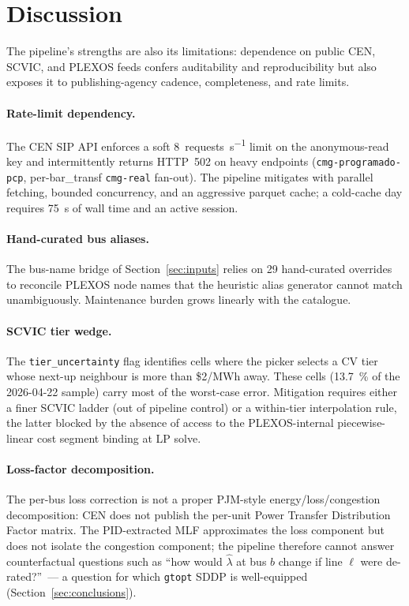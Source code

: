 \section{Discussion}
\label{sec:discussion}

The pipeline's strengths are also its limitations: dependence on
public CEN, SCVIC, and PLEXOS feeds confers auditability and
reproducibility but also exposes it to publishing-agency cadence,
completeness, and rate limits.

\paragraph{Rate-limit dependency.}
The CEN SIP API enforces a soft \SI{8}{requests\per\second} limit on
the anonymous-read key and intermittently returns HTTP~502 on heavy
endpoints (\texttt{cmg-programado-pcp}, per-bar\_transf
\texttt{cmg-real} fan-out).  The pipeline mitigates with parallel
fetching, bounded concurrency, and an aggressive parquet cache; a
cold-cache day requires \SI{75}{\second} of wall time and an active
session.

\paragraph{Hand-curated bus aliases.}
The bus-name bridge of Section~\ref{sec:inputs} relies on \num{29}
hand-curated overrides to reconcile PLEXOS node names that the
heuristic alias generator cannot match unambiguously.  Maintenance
burden grows linearly with the catalogue.

\paragraph{SCVIC tier wedge.}
The \texttt{tier\_uncertainty} flag identifies cells where the picker
selects a CV tier whose next-up neighbour is more than \$2/MWh away.
These cells (\SI{13.7}{\percent} of the 2026-04-22 sample) carry
most of the worst-case error.  Mitigation requires either a finer
SCVIC ladder (out of pipeline control) or a within-tier interpolation
rule, the latter blocked by the absence of access to the
PLEXOS-internal piecewise-linear cost segment binding at LP solve.

\paragraph{Loss-factor decomposition.}
The per-bus loss correction is not a proper PJM-style
energy/loss/congestion decomposition: CEN does not publish the
per-unit Power Transfer Distribution Factor matrix.  The PID-extracted
MLF approximates the loss component but does not isolate the
congestion component; the pipeline therefore cannot answer
counterfactual questions such as ``how would $\hat\lambda$ at bus
$b$ change if line $\ell$ were de-rated?''~— a question for which
\texttt{gtopt} SDDP is well-equipped (Section~\ref{sec:conclusions}).


